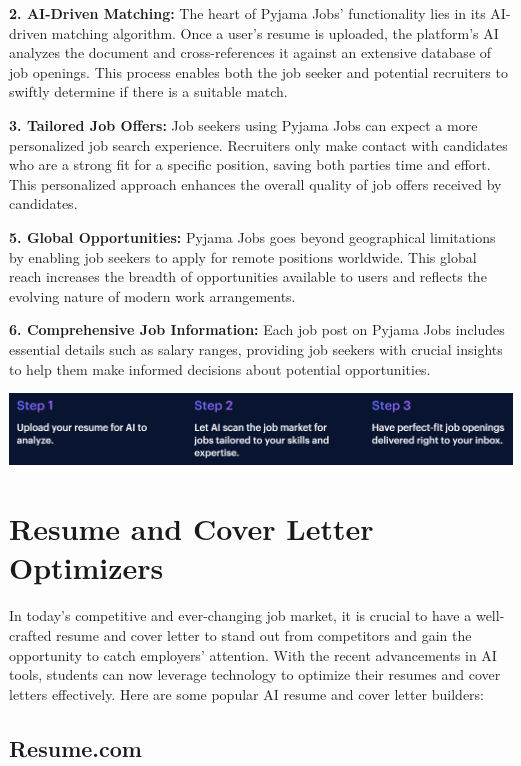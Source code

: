 \documentclass[
]{book}
\begin{document}
\textbf{2. AI-Driven Matching:} The heart of Pyjama Jobs' functionality lies in its AI-driven matching algorithm. Once a user's resume is uploaded, the platform's AI analyzes the document and cross-references it against an extensive database of job openings. This process enables both the job seeker and potential recruiters to swiftly determine if there is a suitable match.

\textbf{3. Tailored Job Offers:} Job seekers using Pyjama Jobs can expect a more personalized job search experience. Recruiters only make contact with candidates who are a strong fit for a specific position, saving both parties time and effort. This personalized approach enhances the overall quality of job offers received by candidates.

\textbf{5. Global Opportunities:} Pyjama Jobs goes beyond geographical limitations by enabling job seekers to apply for remote positions worldwide. This global reach increases the breadth of opportunities available to users and reflects the evolving nature of modern work arrangements.

\textbf{6. Comprehensive Job Information:} Each job post on Pyjama Jobs includes essential details such as salary ranges, providing job seekers with crucial insights to help them make informed decisions about potential opportunities.

\includegraphics[width=5.66667in,height=\textheight]{pyjama jobs.png}

\hypertarget{resume-and-cover-letter-optimizers}{%
\chapter{Resume and Cover Letter Optimizers}\label{resume-and-cover-letter-optimizers}}

In today's competitive and ever-changing job market, it is crucial to have a well-crafted resume and cover letter to stand out from competitors and gain the opportunity to catch employers' attention. With the recent advancements in AI tools, students can now leverage technology to optimize their resumes and cover letters effectively. Here are some popular AI resume and cover letter builders:

\hypertarget{resume.com}{%
\section{Resume.com}\label{resume.com}}
\end{document}
